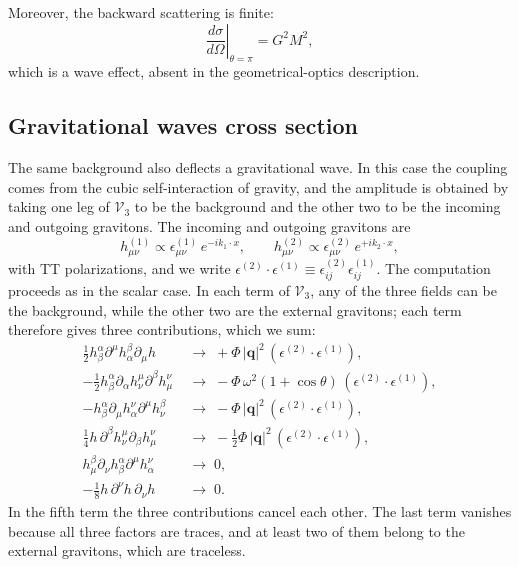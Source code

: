 \documentclass[12pt,a4paper,oneside]{article}
\numberwithin{equation}{section}   %
\begin{document}
Moreover, the backward scattering is finite:
\begin{equation}
    \label{eq:backward}
    \left.\frac{d\sigma}{d\Omega}\right|_{\theta=\pi}
    = G^{2}M^{2},
\end{equation}
which is a wave effect, absent in the geometrical-optics description.

\subsection{Gravitational waves cross section}

The same background also deflects a gravitational wave. In this case the
coupling comes from the cubic self-interaction of gravity, and the amplitude is
obtained by taking one leg of $\mathcal V_3$ to be the background and the other
two to be the incoming and outgoing gravitons. 
The incoming and outgoing gravitons are
\begin{equation}
  h^{(1)}_{\mu\nu}\propto\epsilon^{(1)}_{\mu\nu}\,e^{-ik_1\cdot x},\qquad
  h^{(2)}_{\mu\nu}\propto\epsilon^{(2)}_{\mu\nu}\,e^{+ik_2\cdot x},
\end{equation}
with TT polarizations, and we write
$\epsilon^{(2)}\!\cdot\epsilon^{(1)}\equiv\epsilon^{(2)}_{ij}\epsilon^{(1)}_{ij}$.
The computation proceeds as in the scalar case. In each term of
$\mathcal V_3$, any of the three fields can be the background, while the other
two are the external gravitons; each term therefore gives three contributions,
which we sum:
\begin{align}
  \tfrac12 h_\beta^\alpha\partial^\mu h_\alpha^\beta\partial_\mu h
  &\;\to\;+\Phi\,|\mathbf q|^2\,(\epsilon^{(2)}\!\cdot\epsilon^{(1)}),\\
  -\tfrac12 h_\beta^\alpha\partial_\alpha h_\nu^\mu\partial^\beta h_\mu^\nu
  &\;\to\;-\Phi\,\omega^2(1+\cos\theta)\,(\epsilon^{(2)}\!\cdot\epsilon^{(1)}),\\
  -h_\beta^\alpha\partial_\mu h_\alpha^\nu\partial^\mu h_\nu^\beta
  &\;\to\;-\Phi\,|\mathbf q|^2\,(\epsilon^{(2)}\!\cdot\epsilon^{(1)}),\\
  \tfrac14 h\,\partial^\beta h_\nu^\mu\partial_\beta h_\mu^\nu
  &\;\to\;-\tfrac12\Phi\,|\mathbf q|^2\,(\epsilon^{(2)}\!\cdot\epsilon^{(1)}),\\
  h_\mu^\beta\partial_\nu h_\beta^\alpha\partial^\mu h_\alpha^\nu
  &\;\to\;0,\\
  -\tfrac18 h\,\partial^\nu h\,\partial_\nu h
  &\;\to\;0 .
\end{align}
In the fifth term the three contributions cancel each other. The last term
vanishes because all three factors are traces, and at least two of them belong
to the external gravitons, which are traceless.
\end{document}
